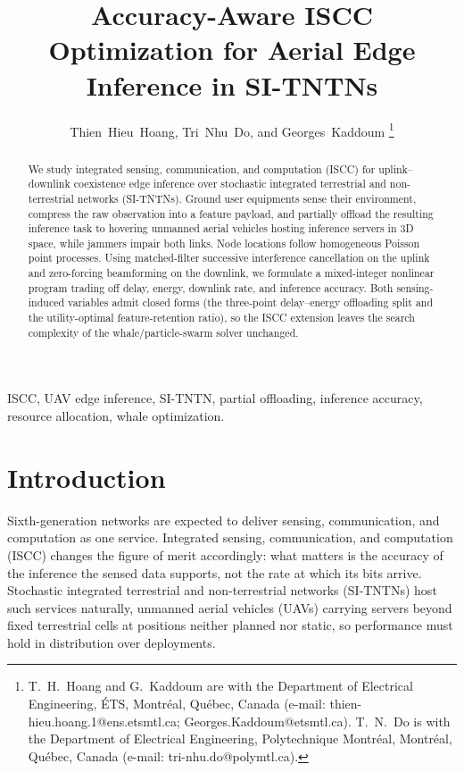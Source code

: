 \documentclass[journal]{IEEEtran}
\begin{document}
\title{Accuracy-Aware ISCC Optimization for Aerial Edge Inference in SI-TNTNs}

\author{Thien~Hieu~Hoang, Tri~Nhu~Do, and Georges~Kaddoum%
\thanks{T.~H.~Hoang and G.~Kaddoum are with the Department of Electrical Engineering, \'{E}TS, Montr\'{e}al, Qu\'{e}bec, Canada (e-mail: \mbox{thien-hieu.hoang.1@ens.etsmtl.ca}; \mbox{Georges.Kaddoum@etsmtl.ca}). T.~N.~Do is with the Department of Electrical Engineering, Polytechnique Montr\'{e}al, Montr\'{e}al, Qu\'{e}bec, Canada (e-mail: \mbox{tri-nhu.do@polymtl.ca}).}}
\maketitle

\begin{abstract}
We study integrated sensing, communication, and computation (ISCC) for uplink--downlink coexistence edge inference over stochastic integrated terrestrial and non-terrestrial networks (SI-TNTNs). Ground user equipments sense their environment, compress the raw observation into a feature payload, and partially offload the resulting inference task to hovering unmanned aerial vehicles hosting inference servers in 3D space, while jammers impair both links. Node locations follow homogeneous Poisson point processes. Using matched-filter successive interference cancellation on the uplink and zero-forcing beamforming on the downlink, we formulate a mixed-integer nonlinear program trading off delay, energy, downlink rate, and inference accuracy. Both sensing-induced variables admit closed forms (the three-point delay--energy offloading split and the utility-optimal feature-retention ratio), so the ISCC extension leaves the search complexity of the whale/particle-swarm solver unchanged.
\end{abstract}

\begin{IEEEkeywords}
ISCC, UAV edge inference, SI-TNTN, partial offloading, inference accuracy, resource allocation, whale optimization.
\end{IEEEkeywords}

\section{Introduction}
Sixth-generation networks are expected to deliver sensing, communication, and computation as one service. Integrated sensing, communication, and computation (ISCC) changes the figure of merit accordingly: what matters is the accuracy of the inference the sensed data supports, not the rate at which its bits arrive. Stochastic integrated terrestrial and non-terrestrial networks (SI-TNTNs) \cite{meftah2026sitntn} host such services naturally, unmanned aerial vehicles (UAVs) carrying servers beyond fixed terrestrial cells at positions neither planned nor static, so performance must hold in distribution over deployments.
\end{document}
